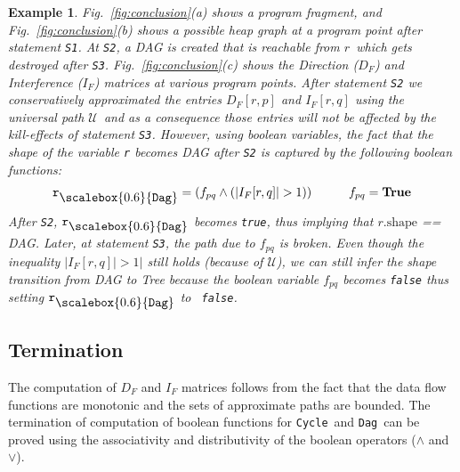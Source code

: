 \documentclass{sig-alternate}
\newtheorem{example}{Example}
\newcommand{\hide}[1]{} %
\newcommand{\myr}{\ensuremath{r}}
\newcommand{\upath}{\ensuremath{\mathcal{U}}}
\newcommand{\shape}{\mbox{shape}}
\newcommand{\subD}{\mbox{\scalebox{0.6}{\Dag}}}
\newcommand{\mb}[1]{\mbox{{\tt #1}}}
\newcommand{\DFM}[2]{\ensuremath{D_F[#1,#2]}}
\newcommand{\IFM}[2]{\ensuremath{I_F[#1,#2]}}
\newcommand{\Dag}{{\tt Dag}}
\newcommand{\Cycle}{{\tt Cycle}}
\newcommand{\true}{\textbf{True}}
\newcommand{\sub}[2]{\ensuremath{{#1}_{#2}}}
\begin{document}
{{\begin{example} {\rm
 Fig.~\ref{fig:conclusion}(a) shows a program fragment, and
 Fig.~\ref{fig:conclusion}(b) shows a possible heap graph at
 a program point after statement {\tt S1}.  At {\tt S2}, a
 DAG is created that is reachable from \myr\ which gets
 destroyed after {\tt S3}.  
 Fig.~\ref{fig:conclusion}(c) shows the Direction
 ($\sub{D}{F}$) and Interference ($\sub{I}{F}$) matrices at
 various program points.  After statement {\tt S2} we
 conservatively approximated the entries \DFM{r}{p} and
 \IFM{r}{q} using the universal path \upath\ and as a
 consequence those entries will not be affected by the
 kill-effects of statement {\tt S3}. However, using boolean
 variables, the fact that the shape of the variable {\tt r} becomes DAG
 after {\tt S2} is captured by the following boolean
 functions:
 \begin{eqnarray*}
   \mb{r}_{\subD} = (\sub{f}{pq} \wedge (|\IFM{r}{q}| > 1))
   &\qquad& \sub{f}{pq} = \true
 \end{eqnarray*}
 After {\tt S2}, $\mb{r}_{\subD}$ becomes {\tt true}, thus
 implying that $\myr.\shape$ == DAG.  Later, at statement
 {\tt S3}, the path due to $\sub{f}{pq}$ is broken. Even
 though the inequality $| \IFM{r}{q} | > 1 |$ still holds
 (because of \upath), we can still infer the shape transition
 from DAG to Tree because the boolean variable $\sub{f}{pq}$
 becomes {\tt false} thus setting $\mb{r}_{\subD}$ to {\tt
   false}.  } \hfill\psframebox{}
\end{example}}}
\subsection{Termination} \label{Termination_Criteria}

The computation of $D_F$ and $I_F$ matrices follows from the
fact that the data flow functions are monotonic and the sets
of approximate paths are bounded. The termination of
computation of boolean functions for \Cycle\ and \Dag\ can be
proved using the associativity and distributivity of the
boolean operators ($\wedge$ and $\vee$).  \hide{The details
  of the proof can be found in~\cite{Sandeep11thesis}.  }
\end{document}
